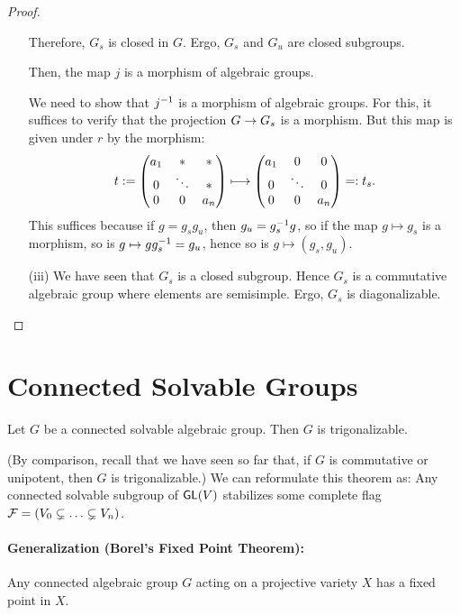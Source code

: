 \begin{proof}
\begin{enumerate}
Therefore, $G_s$ is closed in $G$. Ergo, $G_s$ and $G_u$ are closed subgroups.

Then, the map $j$ is a morphism of algebraic groups.

We need to show that $j^{-1}$ is a morphism of algebraic groups. For this, it suffices to verify that the projection $G \overset{}{\rightarrow} G_s$ is a morphism. But this map is given under $r$ by the morphism:
\begin{align*}
t:={\left(\begin{matrix} a_1 & *& *\\
		0 & \ddots & *\\
		0 & 0 & a_n \end{matrix}\right)} \longmapsto{\left(\begin{matrix} a_1 & 0& 0\\
		0 & \ddots & 0\\
		0 & 0 & a_n \end{matrix}\right)} =: t_s.
\end{align*}
This suffices because if $g = g_s g_u$, then $g_u = g_s^{-1} g$, so if the map $g \mapsto g_s$ is a morphism, so is $g\mapsto gg_s^{-1} = g_u$, hence so is $g \mapsto (g_s, g_u)$.
\item[(iii)] We have seen that $G_s$ is a closed subgroup. Hence $G_s$ is a commutative algebraic group where elements are semisimple. Ergo, $G_s$ is diagonalizable.
\end{enumerate}
\end{proof}

\section{Connected Solvable Groups}

\begin{theorem}
Let $G$ be a connected solvable algebraic group. Then $G$ is trigonalizable.
\end{theorem}
(By comparison, recall that we have seen so far that, if $G$ is commutative or unipotent, then $G$ is trigonalizable.)
We can reformulate this theorem as: Any connected solvable subgroup of $\textsf{GL}(V)$ stabilizes some complete flag $\mathcal{F} = (V_0 \subsetneq \ldots \subsetneq  V_n)$.
\paragraph{Generalization (Borel's Fixed Point Theorem):} Any connected algebraic group $G$ acting on a projective variety $X$ has a fixed point in $X$.

